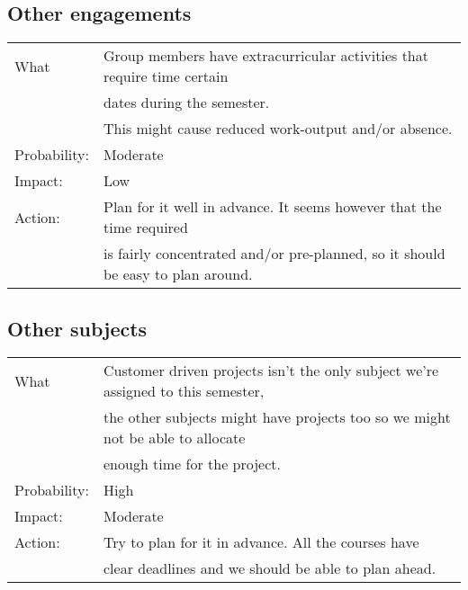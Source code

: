 \documentclass[12pt, a4paper]{article}
\begin{document}
\subsection{Other engagements}
\begin{tabular}{| l | l |}
	\hline
	What & Group members have extracurricular activities that require time certain\\
	 & dates during the semester.\\
	 & This might cause reduced work-output and/or absence.\\
	\hline
	Probability: & Moderate \\
	\hline
	Impact: & Low \\
	\hline
	Action: & Plan for it well in advance. It seems however that the time required\\
	& is fairly concentrated and/or pre-planned, so it should be easy to plan around.\\
	\hline

\end{tabular}

\subsection{Other subjects}
\begin{tabular}{| l | l |}
	\hline
	What & Customer driven projects isn't the only subject we're assigned to this semester,\\
	& the other subjects might have projects too so we might not be able to allocate\\
	& enough time for the project.\\
	\hline
	Probability: & High \\
	\hline
	Impact: & Moderate \\
	\hline
	Action: & Try to plan for it in advance. All the courses have\\
	 & clear deadlines and we should be able to plan ahead.\\
	\hline

\end{tabular}
\end{document}
